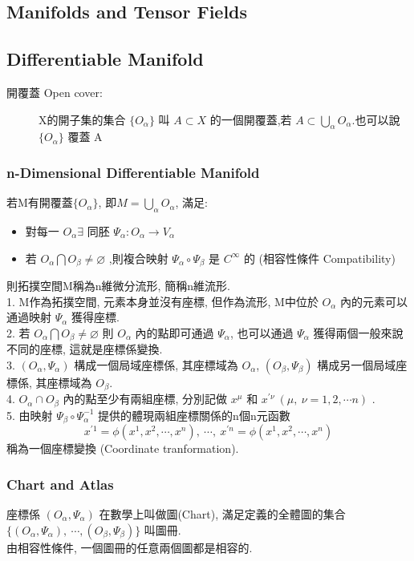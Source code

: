 \documentclass{article}
\begin{document}
\begin{CJK}{UTF8}{bsmi}
\section{Manifolds and Tensor Fields}
\subsection{Differentiable Manifold}
\begin{description}
  \item[開覆蓋 Open cover:]X的開子集的集合 $\{O_\alpha\}$ 叫 $A \subset X$ 的一個開覆蓋,若 $A\subset \bigcup_\alpha O_\alpha$.也可以說$\{O_\alpha\}$ 覆蓋 A
\end{description}
\subsubsection{n-Dimensional Differentiable Manifold}
若M有開覆蓋$\{O_\alpha\}$, 即$M= \bigcup_\alpha O_\alpha$, 滿足:
\begin{itemize}
  \item 對每一 $O_\alpha \exists$ 同胚 $\Psi_\alpha : O_\alpha \rightarrow V_\alpha $ 
  \item 若 $O_\alpha \bigcap O_\beta \neq \varnothing $ ,則複合映射 $\Psi_\alpha \circ \Psi_\beta $ 是 $C^\infty$ 的 (相容性條件 Compatibility)
\end{itemize}
則拓撲空間M稱為n維微分流形, 簡稱n維流形.
\\1. M作為拓撲空間, 元素本身並沒有座標, 但作為流形, M中位於 $O_\alpha$ 內的元素可以通過映射 $\Psi_\alpha$ 獲得座標.
\\2. 若 $O_\alpha \bigcap O_\beta \neq \varnothing $ 則 $O_\alpha$ 內的點即可通過 $\Psi_\alpha$, 也可以通過 $\Psi_\alpha$ 獲得兩個一般來說不同的座標, 這就是座標係變換. 
\\3. $(O_\alpha, \Psi_\alpha)$ 構成一個局域座標係, 其座標域為 $O_\alpha$, $(O_\beta,\Psi_\beta)$ 構成另一個局域座標係, 其座標域為 $O_\beta$.
\\4. $O_\alpha \cap O_\beta$ 內的點至少有兩組座標, 分別記做 ${x^{\mu}}$ 和 $x^{'\nu}\ (\mu ,\ \nu  =1,2,\cdots n)$ . 
\\5. 由映射 $\Psi_\beta \circ \Psi_\alpha^{-1}$ 提供的體現兩組座標關係的n個n元函數 $$x^{'1}=\phi (x^1,x^2,\cdots, x^n),\ \cdots, \ x^{'n}=\phi (x^1,x^2,\cdots, x^n) $$ 稱為一個座標變換 (Coordinate tranformation).
\subsubsection{Chart and Atlas}
座標係 $(O_\alpha, \Psi_\alpha)$ 在數學上叫做圖(Chart), 滿足定義的全體圖的集合 $\{(O_\alpha,\Psi_\alpha),\ \cdots ,(O_\beta,\Psi_\beta)\}$ 叫圖冊.
\\由相容性條件, 一個圖冊的任意兩個圖都是相容的.

\end{CJK}
\end{document}

